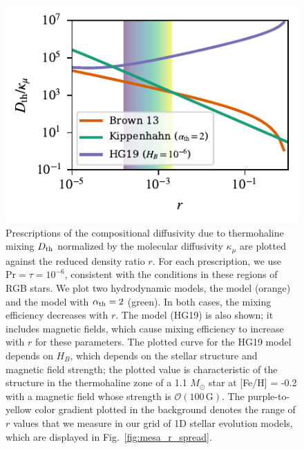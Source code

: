 \begin{figure}
    \centering
    \includegraphics[width=\columnwidth]{Nu_models_comparison.pdf}
    \caption{ 
    Prescriptions of the compositional diffusivity due to thermohaline mixing $D_{\rm th}$ normalized by the molecular diffusivity $\kappa_{\mu}$ are plotted against the reduced density ratio $r$. For each prescription, we use $\mathrm{Pr} = \tau = 10^{-6}$, consistent with the conditions in these regions of RGB stars.
    We plot two hydrodynamic models, the \citet{brown_etal_2013} model (orange) and the \citet{kippenhahn_etal_1980} model with $\alpha_{\rm th} = 2$ (green). In both cases, the mixing efficiency decreases with $r$.
    The \citet{harrington} model (HG19) is also shown; it includes magnetic fields, which cause mixing efficiency to increase with $r$ for these parameters.
    The plotted curve for the HG19 model depends on $H_B$, which depends on the stellar structure and magnetic field strength; the plotted value is characteristic of the structure in the thermohaline zone of a 1.1 $M_\odot$ star at [Fe/H] = -0.2 with a magnetic field whose strength is $\mathcal{O}(100 \,\mathrm{G})$.
    The purple-to-yellow color gradient plotted in the background denotes the range of $r$ values that we measure in our grid of 1D stellar evolution models, which are displayed in Fig.~\ref{fig:mesa_r_spread}.
    }
    \label{fig:parameterization_compare}
\end{figure}
